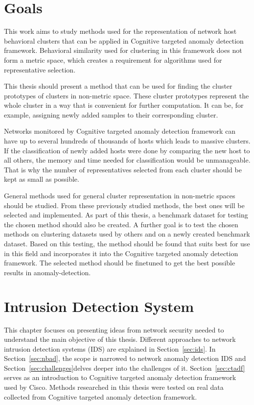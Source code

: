 \documentclass[thesis=B,english]{FITthesis}[2012/10/20]
\begin{document}
\chapter{Goals}

This work aims to study methods used for the representation of network host behavioral clusters that can be applied in Cognitive targeted anomaly detection framework.
Behavioral similarity used for clustering in this framework does not form a metric space, which creates a requirement for algorithms used for representative selection.

This thesis should present a method that can be used for finding the cluster prototypes of clusters in non-metric space.
These cluster prototypes represent the whole cluster in a way that is convenient for further computation.
It can be, for example, assigning newly added samples to their corresponding cluster.

Networks monitored by Cognitive targeted anomaly detection framework can have up to several hundreds of thousands of hosts which leads to massive clusters.
If the classification of newly added hosts were done by comparing the new host to all others, the memory and time needed for classification would be unmanageable.
That is why the number of representatives selected from each cluster should be kept as small as possible.

General methods used for general cluster representation in non-metric spaces should be studied.
From these previously studied methods, the best ones will be selected and implemented.
As part of this thesis, a benchmark dataset for testing the chosen method should also be created.
A further goal is to test the chosen methods on clustering datasets used by others and on a newly created benchmark dataset.
Based on this testing, the method should be found that suits best for use in this field and incorporates it into the Cognitive targeted anomaly detection framework.
The selected method should be finetuned to get the best possible results in anomaly-detection.



\chapter{Intrusion Detection System}\label{ch:ids}

This chapter focuses on presenting ideas from network security needed to understand the main objective of this thesis.
Different approaches to network intrusion detection systems (IDS) are explained in Section~\ref{sec:ids}.
In Section~\ref{sec:nbad}, the scope is narrowed to network anomaly detection IDS and Section~\ref{sec:challenges}delves deeper into the challenges of it.
Section~\ref{sec:ctadf} serves as an introduction to Cognitive targeted anomaly detection framework used by Cisco.
Methods researched in this thesis were tested on real data collected from Cognitive targeted anomaly detection framework.
\end{document}
